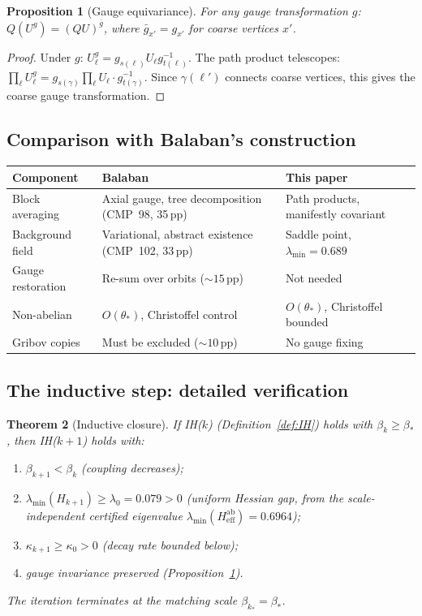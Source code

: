 \documentclass[11pt]{article}
\newtheorem{theorem}{Theorem}[section]
\newtheorem{proposition}[theorem]{Proposition}
\theoremstyle{definition}
\begin{document}
\begin{proposition}[Gauge equivariance]\label{prop:equiv}
For any gauge transformation $g$:
$Q(U^g)=(QU)^{\bar{g}}$, where $\bar{g}_{x'}=g_{x'}$ for coarse
vertices $x'$.
\end{proposition}

\begin{proof}
Under $g$: $U_\ell^g=g_{s(\ell)}U_\ell g_{t(\ell)}^{-1}$.  The
path product telescopes:
$\prod_\ell U_\ell^g=g_{s(\gamma)}\prod_\ell U_\ell\cdot g_{t(\gamma)}^{-1}$.
Since $\gamma(\ell')$ connects coarse vertices, this gives the
coarse gauge transformation.
\end{proof}

\subsection{Comparison with Balaban's construction}

\begin{center}
\begin{tabular}{p{3cm}p{5cm}p{5cm}}
\toprule
\textbf{Component} & \textbf{Balaban} & \textbf{This paper}\\
\midrule
Block averaging & Axial gauge, tree
decomposition~\cite{BalabanAvg,BalabanVar} (CMP~98, 35\,pp) &
Path products, manifestly covariant\\
Background field & Variational, abstract existence (CMP~102, 33\,pp) &
Saddle point, $\lambda_{\min}=0.689$\\
Gauge restoration & Re-sum over orbits (${\sim}15$\,pp) &
Not needed\\
Non-abelian & $O(\theta_*)$, Christoffel control &
$O(\theta_*)$, Christoffel bounded\\
Gribov copies & Must be excluded (${\sim}10$\,pp) & No gauge fixing\\
\bottomrule
\end{tabular}
\end{center}

\subsection{The inductive step: detailed verification}

\begin{theorem}[Inductive closure]\label{thm:inductive}
If IH($k$) (Definition~\ref{def:IH}) holds with $\beta_k\ge\beta_*$,
then IH($k+1$) holds with:
\begin{enumerate}[nosep,label=(\roman*)]
\item $\beta_{k+1}<\beta_k$ (coupling decreases);
\item $\lambda_{\min}(H_{k+1})\ge\lambda_0=0.079>0$ (uniform
Hessian gap, from the scale-independent certified eigenvalue
$\lambda_{\min}(H_{\mathrm{eff}}^{\mathrm{ab}})=0.6964$);
\item $\kappa_{k+1}\ge\kappa_0>0$ (decay rate bounded below);
\item gauge invariance preserved (Proposition~\ref{prop:equiv}).
\end{enumerate}
The iteration terminates at the matching scale
$\beta_{k_*}=\beta_*$.
\end{theorem}
\end{document}
